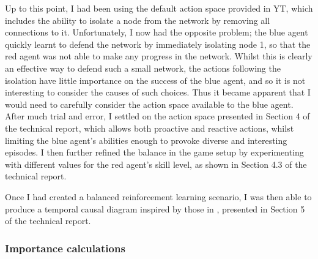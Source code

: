 \documentclass{article}
\begin{document}
Up to this point, I had been using the default action space provided in YT, which includes the ability to isolate a node from the network by removing all connections to it. Unfortunately, I now had the opposite problem; the blue agent quickly learnt to defend the network by immediately isolating node 1, so that the red agent was not able to make any progress in the network. Whilst this is clearly an effective way to defend such a small network, the actions following the isolation have little importance on the success of the blue agent, and so it is not interesting to consider the causes of such choices. Thus it became apparent that I would need to carefully consider the action space available to the blue agent. After much trial and error, I settled on the action space presented in Section 4 of the technical report, which allows both proactive and reactive actions, whilst limiting the blue agent's abilities enough to provoke diverse and interesting episodes. I then further refined the balance in the game setup by experimenting with different values for the red agent's skill level, as shown in Section 4.3 of the technical report. 

Once I had created a balanced reinforcement learning scenario, I was then able to produce a temporal causal diagram inspired by those in \cite{wang2022causal}, presented in Section 5 of the technical report.   


\subsubsection{Importance calculations}
\end{document}
